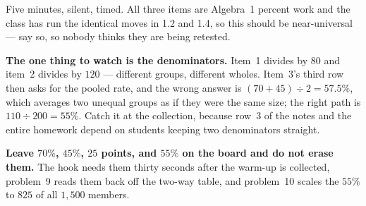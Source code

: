 \documentclass[10pt]{article}
\begin{document}
\begin{teachernote}[Warm-Up]
Five minutes, silent, timed. All three items are Algebra~1 percent work and the class has run
the identical moves in 1.2 and 1.4, so this should be near-universal --- say so, so nobody
thinks they are being retested.

\textbf{The one thing to watch is the denominators.} Item~1 divides by $80$ and item~2 divides
by $120$ --- different groups, different wholes. Item~3's third row then asks for the pooled
rate, and the wrong answer is $(70+45)\div 2 = 57.5\%$, which averages two unequal groups as if
they were the same size; the right path is $110 \div 200 = 55\%$. Catch it at the collection,
because row~3 of the notes and the entire homework depend on students keeping two denominators
straight.

\textbf{Leave $70\%$, $45\%$, $25$ points, and $55\%$ on the board and do not erase them.} The
hook needs them thirty seconds after the warm-up is collected, problem~9 reads them back off
the two-way table, and problem~10 scales the $55\%$ to $825$ of all $1{,}500$ members.
\end{teachernote}
\end{document}
